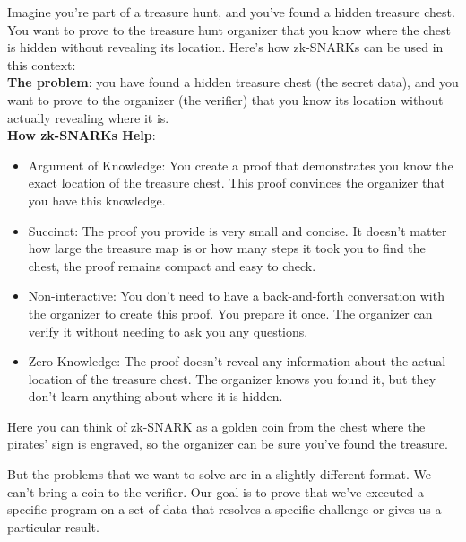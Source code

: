 \documentclass[../lecture-notes.tex]{subfiles}
\begin{document}
\begin{example}
    
    Imagine you're part of a treasure hunt, and you've found a hidden treasure chest. You want to 
    prove to the treasure hunt organizer that you know where the chest is hidden without revealing
    its location. Here's how zk-SNARKs can be used in this context: \\

    \textbf{The problem}: you have found a hidden treasure chest (the secret data), and you want to
    prove to the organizer (the verifier) that you know its location without actually revealing 
    where it is. \\

    \textbf{How zk-SNARKs Help}:

    \begin{itemize}
        \item Argument of Knowledge: You create a proof that demonstrates you know the exact
        location of the treasure chest. This proof convinces the organizer that you have this 
        knowledge.
        \item Succinct: The proof you provide is very small and concise. It doesn't matter how
        large the treasure map is or how many steps it took you to find the chest, the proof remains
        compact and easy to check.
        \item Non-interactive: You don't need to have a back-and-forth conversation with the 
        organizer to create this proof. You prepare it once. The organizer can verify it without 
        needing to ask you any questions.
        \item Zero-Knowledge: The proof doesn't reveal any information about the actual location of
        the treasure chest. The organizer knows you found it, but they don't learn anything about 
        where it is hidden. \\
    \end{itemize}

    Here you can think of zk-SNARK as a golden coin from the chest where the pirates' sign is 
    engraved, so the organizer can be sure you've found the treasure.

\end{example}

But the problems that we want to solve are in a slightly different format. We can't bring a coin to
the verifier. Our goal is to prove that we've executed a specific program on a set of data that 
resolves a specific challenge or gives us a particular result.
\end{document}
